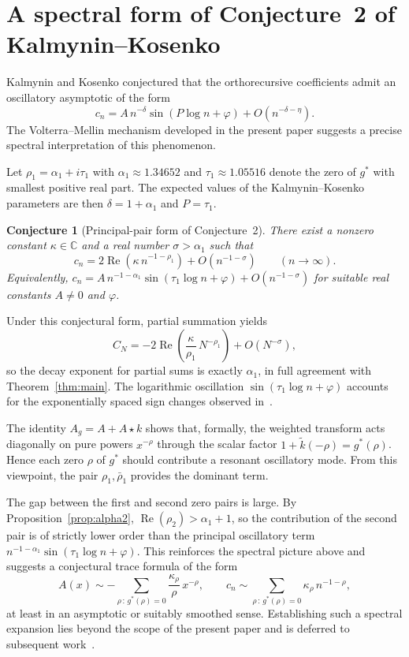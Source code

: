 \documentclass[11pt]{amsart}
\newtheorem{conjecture}[theorem]{Conjecture}
\theoremstyle{definition}
\theoremstyle{remark}
\newcommand{\Real}{\operatorname{Re}}
\begin{document}
\section{A spectral form of Conjecture~2 of Kalmynin--Kosenko}\label{sec:conjecture}

Kalmynin and Kosenko conjectured that the orthorecursive coefficients admit an oscillatory asymptotic of the form
$$
c_n = A\, n^{-\delta} \sin(P \log n + \varphi) + O(n^{-\delta-\eta}).
$$
The Volterra--Mellin mechanism developed in the present paper suggests a precise spectral interpretation of this phenomenon.

Let $\rho_1 = \alpha_1 + i\tau_1$ with $\alpha_1 \approx 1.34652$ and $\tau_1 \approx 1.05516$ denote the zero of $g^*$ with smallest positive real part. The expected values of the Kalmynin--Kosenko parameters are then $\delta = 1 + \alpha_1$ and $P = \tau_1$.

\begin{conjecture}[Principal-pair form of Conjecture~2]\label{conj:main}
There exist a nonzero constant $\kappa \in \mathbb{C}$ and a real number $\sigma > \alpha_1$ such that
$$
c_n = 2\Real\!\left(\kappa\, n^{-1-\rho_1}\right) + O\!\left(n^{-1-\sigma}\right) \qquad (n \to \infty).
$$
Equivalently, $c_n = A\, n^{-1-\alpha_1} \sin(\tau_1 \log n + \varphi) + O(n^{-1-\sigma})$ for suitable real constants $A \neq 0$ and $\varphi$.
\end{conjecture}

Under this conjectural form, partial summation yields
$$
C_N = -2\Real\!\left(\frac{\kappa}{\rho_1}\, N^{-\rho_1}\right) + O(N^{-\sigma}),
$$
so the decay exponent for partial sums is exactly $\alpha_1$, in full agreement with Theorem~\ref{thm:main}. The logarithmic oscillation $\sin(\tau_1 \log n + \varphi)$ accounts for the exponentially spaced sign changes observed in~\cite[Section~5]{KalKos}.

The identity $A_g = A + A \star k$ shows that, formally, the weighted transform acts diagonally on pure powers $x^{-\rho}$ through the scalar factor $1 + \widetilde{k}(-\rho) = g^*(\rho)$. Hence each zero $\rho$ of $g^*$ should contribute a resonant oscillatory mode. From this viewpoint, the pair $\rho_1, \bar\rho_1$ provides the dominant term.

The gap between the first and second zero pairs is large. By Proposition~\ref{prop:alpha2}, $\Real(\rho_2) > \alpha_1 + 1$, so the contribution of the second pair is of strictly lower order than the principal oscillatory term $n^{-1-\alpha_1} \sin(\tau_1 \log n + \varphi)$. This reinforces the spectral picture above and suggests a conjectural trace formula of the form
$$
A(x) \sim -\sum_{\rho \,:\, g^*(\rho) = 0} \frac{\kappa_\rho}{\rho}\, x^{-\rho}, \qquad c_n \sim \sum_{\rho \,:\, g^*(\rho) = 0} \kappa_\rho\, n^{-1-\rho},
$$
at least in an asymptotic or suitably smoothed sense. Establishing such a spectral expansion lies beyond the scope of the present paper and is deferred to subsequent work~\cite{Cloitre_RAF}.
\end{document}
